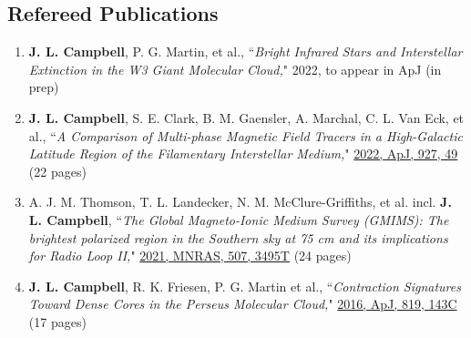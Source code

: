 \documentclass[10pt]{res} %
\begin{document}
\begin{resume}
\section{\Large Refereed Publications}
\vspace{-5pt} %
\noindent\makebox[\linewidth]{\rule{\textwidth}{0.4pt}}
\vspace{-15pt} %

\begin{enumerate}[{start=4,label=\arabic*.\addtocounter{enumi}{-2}}]
\itemsep-1em 
	\item \textbf{J. L. Campbell}, P. G. Martin, et al., ``\textit{Bright Infrared Stars and Interstellar Extinction in the W3 Giant Molecular Cloud,}" 2022, to appear in ApJ (in prep) \\
	\item \textbf{J. L. Campbell}, S. E. Clark, B. M. Gaensler, A. Marchal, C. L. Van Eck, et al., ``\textit{A Comparison of Multi-phase Magnetic Field Tracers in a High-Galactic Latitude Region of the Filamentary Interstellar Medium,}" \href{https://iopscience.iop.org/article/10.3847/1538-4357/ac400d}{2022, ApJ, 927, 49} (22 pages)  \\
	\item A. J. M. Thomson, T. L. Landecker, N. M. McClure-Griffiths, et al. incl. \textbf{J. L. Campbell}, ``\textit{The Global Magneto-Ionic Medium Survey (GMIMS): The brightest polarized region in the Southern sky at 75 cm and its implications for Radio Loop II,}" \href{https://ui.adsabs.harvard.edu/abs/2021arXiv210612595T/abstract}{2021, MNRAS, 507, 3495T} (24 pages) \\
	\item \textbf{J. L. Campbell}, R. K. Friesen, P. G. Martin et al., ``\textit{Contraction Signatures Toward Dense Cores in the Perseus Molecular Cloud,}" \href{https://ui.adsabs.harvard.edu/abs/2016ApJ...819..143C/abstract}{2016, ApJ, 819, 143C} (17 pages)
\end{enumerate}



\end{resume}
\end{document}
